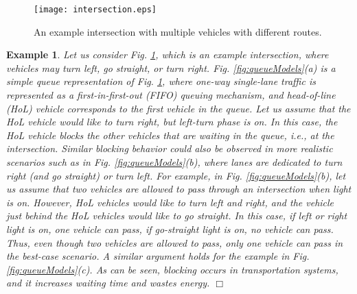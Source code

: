 \documentclass[conference]{IEEEtran}
\newcommand{\ie}{{\em i.e., }}
\newtheorem{example}{Example}
\begin{document}
\begin{figure} [t!]
\centering
\vspace{-10pt}
\texttt{[image: intersection.eps]}
\caption{An example intersection with multiple vehicles with different routes.}
\vspace{-5pt}
\label{fig:intersection}
\vspace{-15pt}
\end{figure}

\begin{example} \label{example:ex1}
Let us consider Fig. \ref{fig:intersection}, which is an example intersection, where vehicles may turn left, go straight, or turn right.
Fig. \ref{fig:queueModels}(a) is a simple queue representation of Fig. \ref{fig:intersection}, where one-way single-lane traffic is represented as a first-in-first-out (FIFO) queuing mechanism, and head-of-line (HoL) vehicle corresponds to the first vehicle in the queue. Let us assume that the HoL vehicle would like to turn right, but left-turn phase is on. In this case, the HoL vehicle blocks the other vehicles that are waiting in the queue, \ie at the intersection. Similar blocking behavior could also be observed in more realistic scenarios such as in Fig. \ref{fig:queueModels}(b), where lanes are dedicated to turn right (and go straight) or turn left. For example, in  Fig. \ref{fig:queueModels}(b), let us assume that two vehicles are allowed to pass through an intersection when light is on. However, HoL vehicles would like to turn left and right, and the vehicle just behind the HoL vehicles would like to go straight. In this case, if left or right light is on, one vehicle can pass, if go-straight light is on, no vehicle can pass. Thus, even though two vehicles are allowed to pass, only one vehicle can pass in the best-case scenario. A similar argument holds for the example in Fig. \ref{fig:queueModels}(c). As can be seen, blocking occurs in transportation systems, and it increases waiting time and wastes energy. \hfill $\Box$
\end{example}
\end{document}
